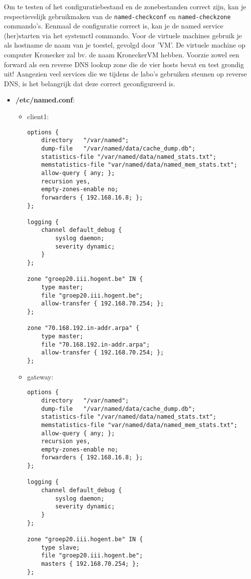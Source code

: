 \documentclass{report}
\begin{document}
Om te testen of het configuratiebestand en de zonebestanden correct zijn, kan je respectievelijk gebruikmaken van de \texttt{named-checkconf} en \texttt{named-checkzone} commando's. Eenmaal de configuratie correct is, kan je de named service (her)starten via het systemctl commando.
Voor de virtuele machines gebruik je als hostname de naam van je toestel, gevolgd door 'VM'. De virtuele machine op computer Kronecker zal bv. de naam KroneckerVM hebben.
Voorzie zowel een forward als een reverse DNS lookup zone die de vier hosts bevat en test grondig uit! Aangezien veel services die we tijdens de labo's gebruiken steunen op reverse DNS, is het belangrijk dat deze correct geconfigureerd is. 
\begin{itemize}
	\item \textbf{/etc/named.conf}: 
	\begin{itemize}
		\item client1:
			\begin{lstlisting}
options {
	directory	"/var/named";
	dump-file	"/var/named/data/cache_dump.db";
	statistics-file	"/var/named/data/named_stats.txt";
	memstatistics-file "var/named/data/named_mem_stats.txt";
	allow-query	{ any; };
	recursion yes,
	empty-zones-enable no;
	forwarders { 192.168.16.8; };
};

logging {
	channel default_debug {
		syslog daemon;
		severity dynamic;
	}
};

zone "groep20.iii.hogent.be" IN {
	type master;
	file "groep20.iii.hogent.be";
	allow-transfer { 192.168.70.254; };
};

zone "70.168.192.in-addr.arpa" {
	type master;
	file "70.168.192.in-addr.arpa";
	allow-transfer { 192.168.70.254; };	
};

			\end{lstlisting}
		\item gateway: 
		\begin{lstlisting}
options {
	directory	"/var/named";
	dump-file	"/var/named/data/cache_dump.db";
	statistics-file	"/var/named/data/named_stats.txt";
	memstatistics-file "var/named/data/named_mem_stats.txt";
	allow-query	{ any; };
	recursion yes,
	empty-zones-enable no;
	forwarders { 192.168.16.8; };
};

logging {
	channel default_debug {
		syslog daemon;
		severity dynamic;
	}
};

zone "groep20.iii.hogent.be" IN {
	type slave;
	file "groep20.iii.hogent.be";
	masters { 192.168.70.254; };
};


\end{lstlisting}
\end{itemize}
\end{itemize}
\end{document}
